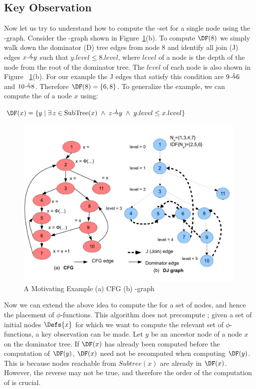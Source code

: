 {\subsection{Key Observation} 
 
Now let us try to understand how to compute the \DF-set for a single node using the \DJ-graph. 
Consider  the \DJ-graph shown in Figure~\ref{fig:cfg}(b). To compute $\DF(8)$ we simply walk down the
dominator (D) tree edges from node 8 and identify all join (J) edges $x \st{J} y$ such
that $y.level \leq 8.level$, where $level$ of a node is the depth of the node from the
root of the dominator tree. The $level$ of each node is also shown in Figure ~\ref{fig:cfg}(b).
For our example the J edges that satisfy this 
condition are $9 \st{J} 6$ and $10 \st{J} 8$. Therefore $\DF(8) = \{6, 8\}$. To generalize the example, we can
compute the \DF of a node $x$ using:
\begin{center}
  $\DF(x) = \{y\mid\exists\, z \in {\rm SubTree}(x) \; \wedge \; z \st{J} y \; \wedge \; y.level \leq x.level \}$
\end{center}

    \begin{figure}[htb]
    \centerline{\includegraphics[scale=0.4]{cfglive_new.pdf}}
    \caption{A Motivating Example (a) CFG (b) \DJ-graph}
    \label{fig:cfg}
    \end{figure} 

Now we can extend the above idea to compute the \iDF for a set of nodes, and 
hence the placement of $\phi$-functions. This algorithm does not precompute \DF; given a set of initial nodes $\Defs{x}$ for which we want to compute the relevant set of $\phi$-functions,
a key observation can be made. Let $y$ be an ancestor node of a node $x$ on the dominator tree. If $\DF(x)$ has already been computed before the computation of $\DF(y)$,  $\DF(x)$ need not
be recomputed when computing $\DF(y)$. This is because nodes reachable from $Subtree(x)$ are already in $\DF(x)$. However, the reverse may not be true, and  therefore the order of the computation of \DF is crucial.

}
